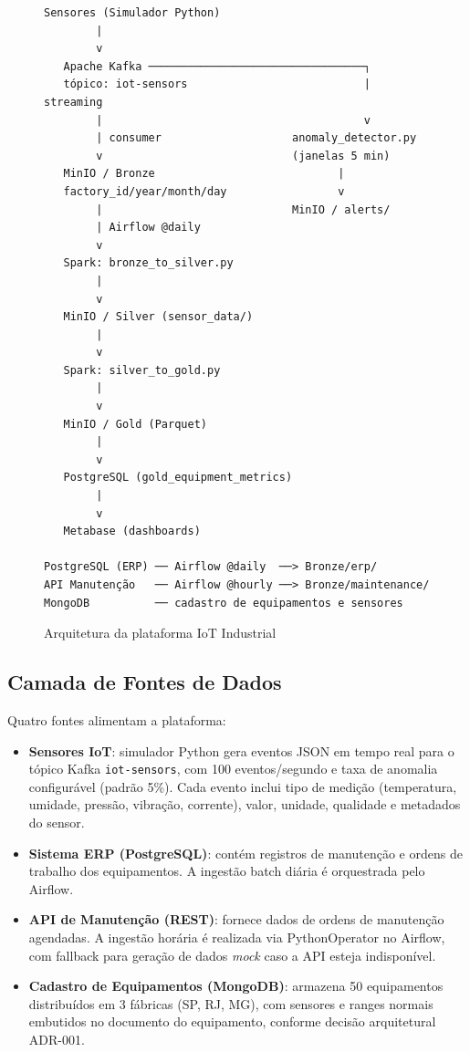 \begin{figure}[h]
\centering
\begin{verbatim}
Sensores (Simulador Python)
        |
        v
   Apache Kafka ─────────────────────────────────┐
   tópico: iot-sensors                           | streaming
        |                                        v
        | consumer                    anomaly_detector.py
        v                             (janelas 5 min)
   MinIO / Bronze                            |
   factory_id/year/month/day                 v
        |                             MinIO / alerts/
        | Airflow @daily
        v
   Spark: bronze_to_silver.py
        |
        v
   MinIO / Silver (sensor_data/)
        |
        v
   Spark: silver_to_gold.py
        |
        v
   MinIO / Gold (Parquet)
        |
        v
   PostgreSQL (gold_equipment_metrics)
        |
        v
   Metabase (dashboards)

PostgreSQL (ERP) ── Airflow @daily  ──> Bronze/erp/
API Manutenção   ── Airflow @hourly ──> Bronze/maintenance/
MongoDB          ── cadastro de equipamentos e sensores
\end{verbatim}
\caption{Arquitetura da plataforma IoT Industrial}
\label{fig:arquitetura}
\end{figure}

\subsection{Camada de Fontes de Dados}

Quatro fontes alimentam a plataforma:

\begin{itemize}
    \item \textbf{Sensores IoT}: simulador Python gera eventos JSON em tempo real para o
    tópico Kafka \texttt{iot-sensors}, com 100 eventos/segundo e taxa de anomalia
    configurável (padrão 5\%). Cada evento inclui tipo de medição (temperatura, umidade,
    pressão, vibração, corrente), valor, unidade, qualidade e metadados do sensor.

    \item \textbf{Sistema ERP (PostgreSQL)}: contém registros de manutenção e ordens
    de trabalho dos equipamentos. A ingestão batch diária é orquestrada pelo Airflow.

    \item \textbf{API de Manutenção (REST)}: fornece dados de ordens de manutenção
    agendadas. A ingestão horária é realizada via PythonOperator no Airflow, com
    fallback para geração de dados \textit{mock} caso a API esteja indisponível.

    \item \textbf{Cadastro de Equipamentos (MongoDB)}: armazena 50 equipamentos
    distribuídos em 3 fábricas (SP, RJ, MG), com sensores e ranges normais embutidos
    no documento do equipamento, conforme decisão arquitetural ADR-001.
\end{itemize}

